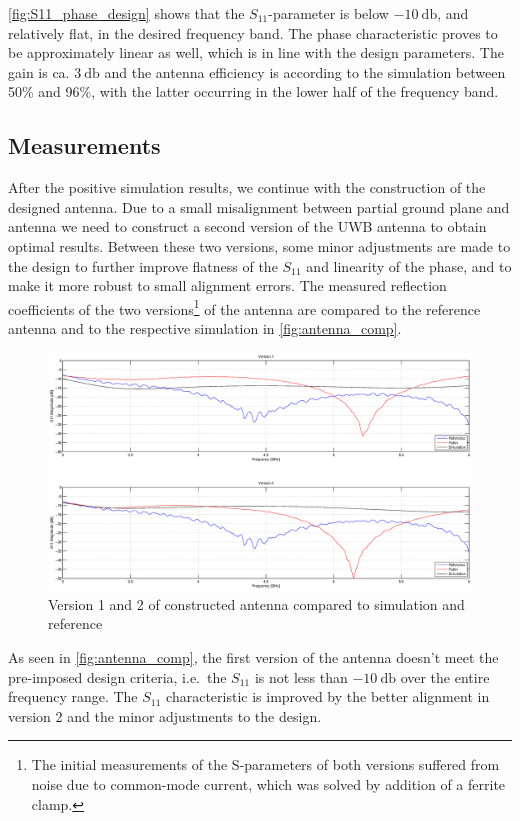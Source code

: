 \documentclass[a4paper]{article}        %
\begin{document}
		\autoref{fig:S11_phase_design} shows that the $S_{11}$-parameter is below $\SI{-10}{\decibel}$, and relatively flat, in the desired frequency band. The phase characteristic proves to be approximately linear as well, which is in line with the design parameters. The gain is ca. $\SI{3}{\decibel}$ and the antenna efficiency is according to the simulation between 50\% and 96\%, with the latter occurring in the lower half of the frequency band. 

	\subsection{Measurements}
		After the positive simulation results, we continue with the construction of the designed antenna. Due to a small misalignment between partial ground plane and antenna we need to construct a second version of the UWB antenna to obtain optimal results. Between these two versions, some minor adjustments are made to the design to further improve flatness of the $S_{11}$ and linearity of the phase, and to make it more robust to small alignment errors. The measured reflection coefficients of the two versions\footnote{The initial measurements of the S-parameters of both versions suffered from noise due to common-mode current, which was solved by addition of a ferrite clamp.} of the antenna are compared to the reference antenna and to the respective simulation in \autoref{fig:antenna_comp}. 

		\begin{figure}[H]
			\centering
			\includegraphics[width=\textwidth]{images/antenna/antenna_comparison}
			\caption{Version 1 and 2 of constructed antenna compared to simulation and reference}
			\label{fig:antenna_comp}
		\end{figure}

		As seen in \autoref{fig:antenna_comp}, the first version of the antenna doesn't meet the pre-imposed design criteria, i.e.\ the $S_{11}$ is not less than $\SI{-10}{\decibel}$ over the entire frequency range.
		The $S_{11}$ characteristic is improved by the better alignment in version 2 and the minor adjustments to the design.
\end{document}
